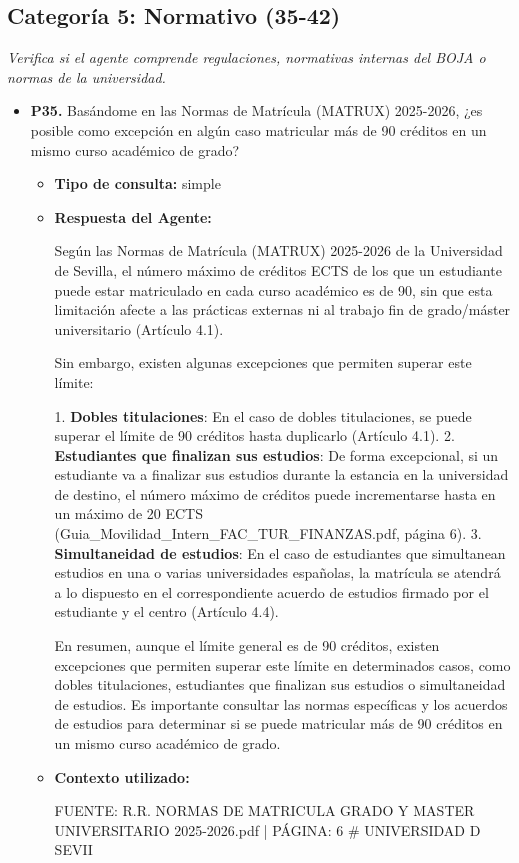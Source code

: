 \documentclass{article}
\begin{document}
\subsection{Categoría 5: Normativo (35-42)}
\textit{Verifica si el agente comprende regulaciones, normativas internas del BOJA o normas de la universidad.}
\begin{itemize}
  \item \textbf{P35.} Basándome en las Normas de Matrícula (MATRUX) 2025-2026, ¿es posible como excepción en algún caso matricular más de 90 créditos en un mismo curso académico de grado? \\
        \begin{itemize}
          \item \textbf{Tipo de consulta:} simple
          \item \textbf{Respuesta del Agente:}

                Según las Normas de Matrícula (MATRUX) 2025-2026 de la Universidad de Sevilla, el número máximo de créditos ECTS de los que un estudiante puede estar matriculado en cada curso académico es de 90, sin que esta limitación afecte a las prácticas externas ni al trabajo fin de grado/máster universitario (Artículo 4.1).

                Sin embargo, existen algunas excepciones que permiten superar este límite:

                1. \textbf{Dobles titulaciones}: En el caso de dobles titulaciones, se puede superar el límite de 90 créditos hasta duplicarlo (Artículo 4.1).
                2. \textbf{Estudiantes que finalizan sus estudios}: De forma excepcional, si un estudiante va a finalizar sus estudios durante la estancia en la universidad de destino, el número máximo de créditos puede incrementarse hasta en un máximo de 20 ECTS (Guia\_Movilidad\_Intern\_FAC\_TUR\_FINANZAS.pdf, página 6).
                3. \textbf{Simultaneidad de estudios}: En el caso de estudiantes que simultanean estudios en una o varias universidades españolas, la matrícula se atendrá a lo dispuesto en el correspondiente acuerdo de estudios firmado por el estudiante y el centro (Artículo 4.4).

                En resumen, aunque el límite general es de 90 créditos, existen excepciones que permiten superar este límite en determinados casos, como dobles titulaciones, estudiantes que finalizan sus estudios o simultaneidad de estudios. Es importante consultar las normas específicas y los acuerdos de estudios para determinar si se puede matricular más de 90 créditos en un mismo curso académico de grado.
          \item \textbf{Contexto utilizado:}
                \begin{scriptsize}
                  FUENTE: R.R. NORMAS DE MATRICULA GRADO Y MASTER UNIVERSITARIO 2025-2026.pdf | PÁGINA: 6
                  \# UNIVERSIDAD D SEVII


\end{scriptsize}
\end{itemize}
\end{itemize}
\end{document}
